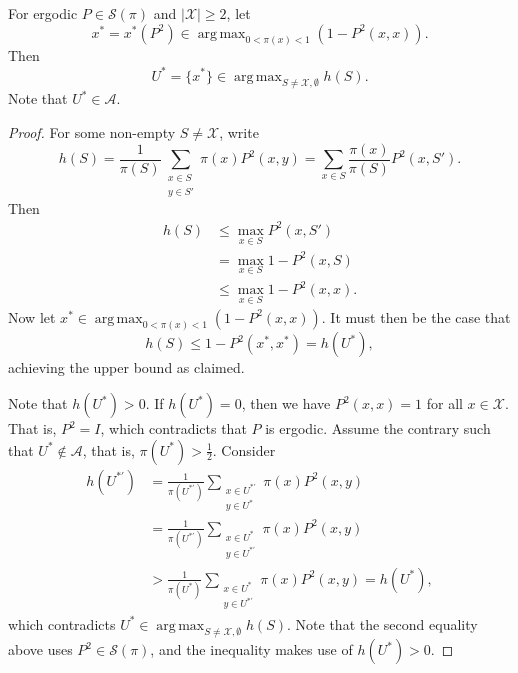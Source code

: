 \documentclass[10pt,a4paper]{amsart}
\DeclareMathOperator*{\argmax}{arg\,max}
\begin{document}
\begin{proposition} \label{prop:x* optimal}
    For ergodic $P \in \mathcal{S}(\pi)$ and $|\mathcal{X}| \geq 2$, let 
    $$x^* = x^*(P^2) \in \argmax_{0 < \pi(x) < 1} \left(1-P^2(x,x)\right).$$
    Then 
    $$U^* = \{x^*\} \in \argmax_{S \neq \mathcal{X}, \emptyset} h(S).$$
    Note that $U^* \in \mathcal{A}$.
\end{proposition}

\begin{proof}
    For some non-empty $S \neq \mathcal{X}$, write 
    $$h(S) = \frac{1}{\pi(S)} \sum_{\substack{x \in S\\ y \in S'}} \pi(x)P^2(x,y) = \sum_{x \in S} \frac{\pi(x)}{\pi(S)} P^2(x,S').$$
    Then 
    \begin{align*}
        h(S) &\leq \max_{x \in S} P^2(x, S')\\
        &= \max_{x \in S} 1-P^2(x,S) \\
        &\leq \max_{x \in S} 1 - P^2(x,x).
    \end{align*}
    Now let $x^* \in \argmax_{0 < \pi(x) < 1} \left(1-P^2(x,x)\right).$ It must then be the case that 
    $$h(S) \leq 1 - P^2(x^*, x^*) = h(U^*),$$
    achieving the upper bound as claimed.
    
    Note that $h(U^*) > 0$. If $h(U^*) = 0$, then we have $P^2(x,x) = 1$ for all $x \in \mathcal{X}$. That is, $P^2 = I$, which contradicts that $P$ is ergodic.
    Assume the contrary such that $U^* \notin \mathcal{A}$, that is, $\pi(U^*) > \frac{1}{2}$. Consider
    \begin{align*}
        h(U^{*\prime}) &= \frac{1}{\pi(U^{*'})} \sum_{\substack{x \in U^{*'}\\ y \in U^{*}}} \pi(x)P^2(x,y) \\
        &= \frac{1}{\pi(U^{*'})} \sum_{\substack{x \in U^{*}\\ y \in U^{*'}}} \pi(x)P^2(x,y) \\
        &> \frac{1}{\pi(U^{*})} \sum_{\substack{x \in U^{*}\\ y \in U^{*'}}} \pi(x)P^2(x,y) = h(U^*),
    \end{align*}
    which contradicts $U^* \in \argmax_{S \neq \mathcal{X}, \emptyset} h(S)$. Note that the second equality above uses $P^2 \in \mathcal{S}(\pi)$, and the inequality makes use of $h(U^*) > 0$. 

\end{proof}
\end{document}
